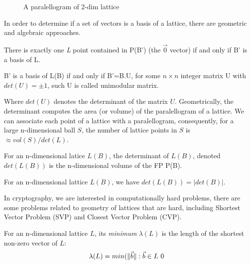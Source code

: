 \begin{description}
\begin{description}
\begin{figure}[h]
                \caption{A paralellogram of 2-dim lattice}
                \label{fig:paralellopiped}
            \end{figure}
            In order to determine if a set of vectors is a basis of a lattice,
            there are geometric and algebraic approaches.
            \begin{lemma}
                There is exactly one \emph{L} point contained in P(B') (the
                $\vec{0}$ vector) if and only if B' is a basis of L.
                \label{lem:parallelopiped}
            \end{lemma}
            \begin{lemma}
                B' is a basis of L(B) if and only if B'=B.U, for some $n \times
                n$ integer matrix U with $det(U) = \pm 1$, such U is called
                unimodular matrix.
                \label{lem:detBasis}
            \end{lemma}
            Where $det(U)$ denotes the determinant of the matrix $U$.
            Geometrically, the determinant computes the area (or volume) of the
            paralellogram of a lattice. We can associate each point of a lattice
            with a paralellogram, consequently, for a large n-dimensional ball
            $S$, the number of lattice points in $S$ is $\approx vol(S) /
            det(L)$.
            \begin{definition}
                For an n-dimensional latice $L(B)$, the determinant of
                $L(B)$, denoted $det(L(B))$ is the n-dimensional volume of the
                FP P(B).
                \label{def:determinant}
            \end{definition}
            \begin{lemma}
                For an n-dimensional lattice $L(B)$, we have $det(L(B)) =
                    |det(B)|$.
                \label{lem:determinant2}
            \end{lemma}
            In cryptography, we are interested in computationally hard problems,
            there are some problems related to geometry of lattices that are
            hard, including Shortest Vector Problem (SVP) and Closest Vector
            Problem (CVP).
            \begin{definition}
                For an n-dimensional lattice $L$, its \emph{minimum}
                $\lambda(L)$ is the length of the shortest non-zero vector of
                $L$:
                \[
                    \lambda(L) = min(\Vert \vec{b} \Vert: \vec{b} \in L \ 0
\]
\end{definition}
\end{description}
\end{description}
